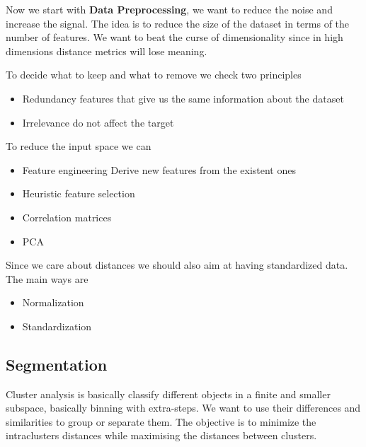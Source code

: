 \vspace{10pt}

Now we start with \textbf{Data Preprocessing}, we want to reduce the noise and increase the signal.
The idea is to reduce the size of the dataset in terms of the number of features. 
We want to beat the curse of dimensionality since in high dimensions distance metrics will lose meaning.

\vspace{10pt}

To decide what to keep and what to remove we check two principles

\begin{itemize}
    \item Redundancy \ra features that give us the same information about the dataset
    \item Irrelevance \ra do not affect the target
\end{itemize}

To reduce the input space we can
\begin{itemize}
    \item Feature engineering \ra Derive new features from the existent ones
    \item Heuristic feature selection
    \item Correlation matrices
    \item PCA
\end{itemize}

\vspace{10pt}

Since we care about distances we should also aim at having standardized data.
The main ways are

\begin{itemize}
    \item Normalization
    \item Standardization
\end{itemize}


\subsection{Segmentation}


Cluster analysis is basically classify different objects in a finite and smaller subspace, basically binning with extra-steps.
We want to use their differences and similarities to group or separate them.
The objective is to minimize the intraclusters distances while maximising the distances between clusters.

\vspace{10pt}

